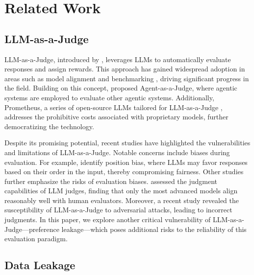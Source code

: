 \section{Related Work}
\subsection{LLM-as-a-Judge}

LLM-as-a-Judge, introduced by \citet{zheng2023judging}, leverages LLMs to automatically evaluate responses and assign rewards. This approach has gained widespread adoption in areas such as model alignment \cite{zhang-etal-2024-self} and benchmarking \cite{liu2023alignbench,zhang2024balancing,gao2023human,zhong2024law}, driving significant progress in the field. Building on this concept, \citet{zhuge2024agent} proposed Agent-as-a-Judge, where agentic systems are employed to evaluate other agentic systems. Additionally, Prometheus, a series of open-source LLMs tailored for LLM-as-a-Judge \cite{kim2023prometheus, kim2024prometheus}, addresses the prohibitive costs associated with proprietary models, further democratizing the technology.

Despite its promising potential, recent studies have highlighted the vulnerabilities and limitations of LLM-as-a-Judge. Notable concerns include biases during evaluation. For example, \citet{zheng2023judging} identify position bias, where LLMs may favor responses based on their order in the input, thereby compromising fairness. Other studies \cite{ye2024justice, koo2023benchmarking, chen2024humans, zheng2023judging, huang2024position} further emphasize the risks of evaluation biases. \citet{thakur2024judging} assessed the judgment capabilities of LLM judges, finding that only the most advanced models align reasonably well with human evaluators. Moreover, a recent study \cite{10.1145/3658644.3690291} revealed the susceptibility of LLM-as-a-Judge to adversarial attacks, leading to incorrect judgments. In this paper, we explore another critical vulnerability of LLM-as-a-Judge—preference leakage—which poses additional risks to the reliability of this evaluation paradigm.




\subsection{Data Leakage}


